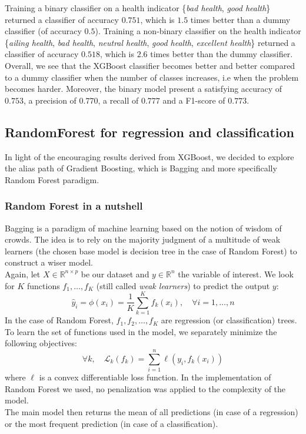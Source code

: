 \documentclass[]{article}
\begin{document}
\noindent
Training a binary classifier on a health indicator \{\textit{bad health}, \textit{good health}\}
returned a classifier of accuracy $0.751$, which is $1.5$ times better than a dummy classifier (of accuracy $0.5$). Training a non-binary classifier on the health indicator \{\textit{ailing health}, \textit{bad health}, \textit{neutral health}, \textit{good health}, \textit{excellent health}\} returned a classifier of accuracy $0.518$, which is $2.6$ times better than the dummy classifier.\\
Overall, we see that the XGBoost classifier becomes better and better compared to a dummy classifier when the number of classes increases, i.e when the problem becomes harder. Moreover, the binary model present a satisfying accuracy of $0.753$, a precision of $0.770$, a recall of $0.777$ and a F1-score of $0.773$.

\subsection{RandomForest for regression and classification}
In light of the encouraging results derived from XGBoost, we decided to explore the alias path of Gradient Boosting, which is Bagging and more specifically Random Forest \cite{randomForest2012} paradigm.
\subsubsection{Random Forest in a nutshell}
Bagging is a paradigm of machine learning based on the notion of wisdom of crowds. The idea is to rely on the majority judgment of a multitude of weak learners (the chosen base model is decision tree in the case of Random Forest) to construct a wiser model.\\

\noindent
Again, let $X\in \mathbb{R}^{n\times p}$ be our dataset and $y\in \mathbb{R}^n$ the variable of interest. We look for $K$ functions $f_1,\dots,f_K$ (still called \textit{weak learners}) to predict the output $y$:
\begin{equation}
	\hat{y}_i = \phi(x_i) = \frac{1}{K}\sum_{k=1}^K f_k(x_i),\quad \forall i=1, \dots, n
\end{equation}
In the case of Random Forest, $f_1,f_2,\dots,f_K$ are regression (or classification) trees.\\
To learn the set of functions used in the model, we separately minimize the following objectives:
\begin{equation}
	\label{randomForest_objective}
	\forall k, \quad \mathcal{L}_k(f_k) = \sum_{i=1}^n \ell(y_i, f_k(x_i))
\end{equation}
where $\ell$ is a convex differentiable loss function. In the implementation of Random Forest we used, no penalization was applied to the complexity of the model.\\
The main model then returns the mean of all predictions (in case of a regression) or the most frequent prediction (in case of a classification).\\
\end{document}
